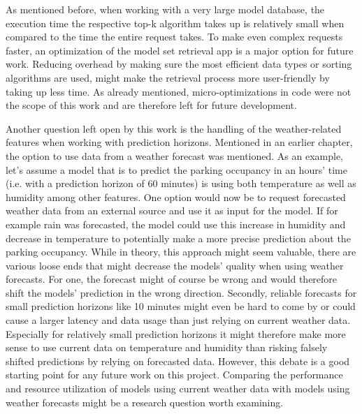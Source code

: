 As mentioned before, when working with a very large model database, the execution time the respective top-k algorithm takes up is relatively small when compared to the time the entire request takes. To make even complex requests faster, an optimization of the model set retrieval app is a major option for future work. Reducing overhead by making sure the most efficient data types or sorting algorithms are used, might make the retrieval process more user-friendly by taking up less time. As already mentioned, micro-optimizations in code were not the scope of this work and are therefore left for future development.

Another question left open by this work is the handling of the weather-related features when working with prediction horizons. Mentioned in an earlier chapter, the option to use data from a weather forecast was mentioned. As an example, let’s assume a model that is to predict the parking occupancy in an hours’ time (i.e. with a prediction horizon of 60 minutes) is using both temperature as well as humidity among other features. One option would now be to request forecasted weather data from an external source and use it as input for the model. If for example rain was forecasted, the model could use this increase in humidity and decrease in temperature to potentially make a more precise prediction about the parking occupancy. While in theory, this approach might seem valuable, there are various loose ends that might decrease the models’ quality when using weather forecasts. For one, the forecast might of course be wrong and would therefore shift the models’ prediction in the wrong direction. Secondly, reliable forecasts for small prediction horizons like 10 minutes might even be hard to come by or could cause a larger latency and data usage than just relying on current weather data. Especially for relatively small prediction horizons it might therefore make more sense to use current data on temperature and humidity than risking falsely shifted predictions by relying on forecasted data. However, this debate is a good starting point for any future work on this project. Comparing the performance and resource utilization of models using current weather data with models using weather forecasts might be a research question worth examining. 

